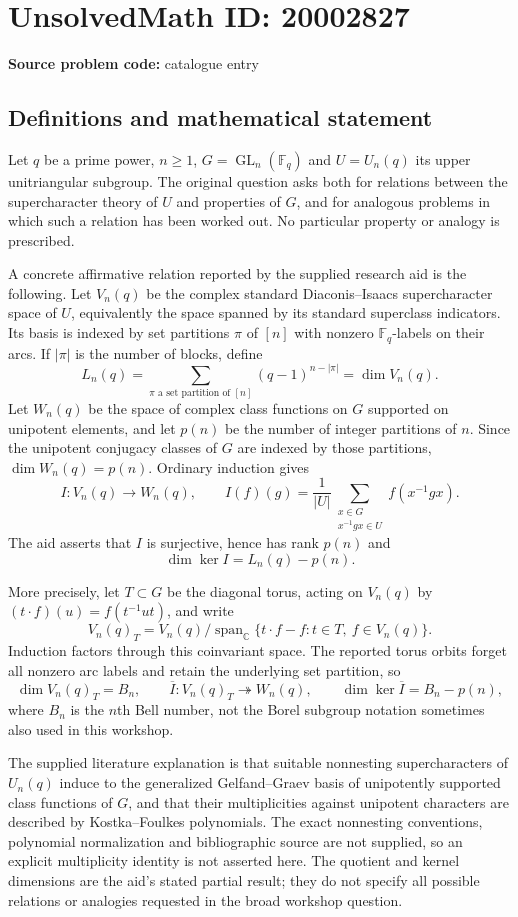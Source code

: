 \documentclass[11pt]{article}
\newcommand{\C}{\mathbb{C}}
\newcommand{\F}{\mathbb{F}}
\begin{document}
\section*{UnsolvedMath ID: 20002827}
\textbf{Source problem code:} catalogue entry
\subsection{Definitions and mathematical statement}
Let $q$ be a prime power, $n\geq1$, $G=\operatorname{GL}_n(\F_q)$ and $U=U_n(q)$ its upper unitriangular subgroup. The original question asks both for relations between the supercharacter theory of $U$ and properties of $G$, and for analogous problems in which such a relation has been worked out. No particular property or analogy is prescribed.

A concrete affirmative relation reported by the supplied research aid is the following. Let $V_n(q)$ be the complex standard Diaconis--Isaacs supercharacter space of $U$, equivalently the space spanned by its standard superclass indicators. Its basis is indexed by set partitions $\pi$ of $[n]$ with nonzero $\F_q$-labels on their arcs. If $|\pi|$ is the number of blocks, define
\[
L_n(q)=\sum_{\pi\text{ a set partition of }[n]}(q-1)^{n-|\pi|}=\dim V_n(q).
\]
Let $W_n(q)$ be the space of complex class functions on $G$ supported on unipotent elements, and let $p(n)$ be the number of integer partitions of $n$. Since the unipotent conjugacy classes of $G$ are indexed by those partitions, $\dim W_n(q)=p(n)$. Ordinary induction gives
\[
I:V_n(q)\longrightarrow W_n(q),\qquad
I(f)(g)=\frac1{|U|}\sum_{\substack{x\in G\\x^{-1}gx\in U}}f(x^{-1}gx).
\]
The aid asserts that $I$ is surjective, hence has rank $p(n)$ and
\[
\dim\ker I=L_n(q)-p(n).
\]

More precisely, let $T\subset G$ be the diagonal torus, acting on $V_n(q)$ by $(t\cdot f)(u)=f(t^{-1}ut)$, and write
\[
V_n(q)_T=V_n(q)/\operatorname{span}_{\C}\{t\cdot f-f:t\in T,\ f\in V_n(q)\}.
\]
Induction factors through this coinvariant space. The reported torus orbits forget all nonzero arc labels and retain the underlying set partition, so
\[
\dim V_n(q)_T=B_n,\qquad
\overline I:V_n(q)_T\twoheadrightarrow W_n(q),\qquad
\dim\ker\overline I=B_n-p(n),
\]
where $B_n$ is the $n$th Bell number, not the Borel subgroup notation sometimes also used in this workshop.

The supplied literature explanation is that suitable nonnesting supercharacters of $U_n(q)$ induce to the generalized Gelfand--Graev basis of unipotently supported class functions of $G$, and that their multiplicities against unipotent characters are described by Kostka--Foulkes polynomials. The exact nonnesting conventions, polynomial normalization and bibliographic source are not supplied, so an explicit multiplicity identity is not asserted here. The quotient and kernel dimensions are the aid's stated partial result; they do not specify all possible relations or analogies requested in the broad workshop question.
\end{document}
